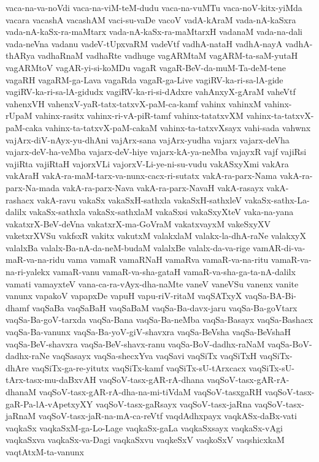 {vaca-na-va-noVdi
vaca-na-viM-teM-dudu
vaca-na-vuMTu
vaca-noV-kitx-yiMda
vacara
vacashA
vacashAM
vaci-su-vaDe
vacoV
vadA-kAraM
vada-nA-kaSxra
vada-nA-kaSx-ra-maMtarx
vada-nA-kaSx-ra-maMtarxH
vadanaM
vada-na-dali
vada-neVna
vadanu
vadeV-tUpxvaRM
vadeVtf
vadhA-nataH
vadhA-nayA
vadhA-thARya
vadhaRnaM
vadhaRte
vadhuge
vagARMtaM
vagARM-ta-saM-yutaH
vagARMtoV
vagAR-yi-si-koMDu
vagaR
vagaR-BeV-da-muM-Ta-deM-tene
vagaRH
vagaRM-ga-Lava
vagaRda
vagaR-ga-Live
vagiRV-ka-ri-sa-lA-gide
vagiRV-ka-ri-sa-lA-gidudx
vagiRV-ka-ri-si-dAdxre
vahAnxyX-gAraM
vaheVtf
vahenxVH
vahenxV-yaR-tatx-tatxvX-paM-ca-kamf
vahinx
vahinxM
vahinx-rUpaM
vahinx-rasitx
vahinx-ri-vA-piR-tamf
vahinx-tatatxvXM
vahinx-ta-tatxvX-paM-caka
vahinx-ta-tatxvX-paM-cakaM
vahinx-ta-tatxvXsayx
vahi-sada
vahwnx
vajArx-diV-nAyx-yu-dhAni
vajArx-sana
vajArx-yudha
vajarx
vajarx-deVha
vajarx-deV-ha-veMba
vajarx-deV-hiye
vajarx-kA-ya-neMba
vajayxR
vajf
vajiRsi
vajiRta
vajiRtaH
vajorxVLi
vajorxV-Li-ye-ni-su-vudu
vakASxyXmi
vakAra
vakAraH
vakA-ra-maM-tarx-va-nunx-cacx-ri-sutatx
vakA-ra-parx-Nama
vakA-ra-parx-Na-mada
vakA-ra-parx-Nava
vakA-ra-parx-NavaH
vakA-rasayx
vakA-rashacx
vakA-ravu
vakaSx
vakaSxH-sathxla
vakaSxH-sathxleV
vakaSx-sathx-La-dalilx
vakaSx-sathxla
vakaSx-sathxlaM
vakaSxsi
vakaSxyXteV
vaka-na-yana
vakatxrX-BeV-deVna
vakatxrX-ma-GoVraM
vakatxvayxM
vakeSxyXV
vaketxrXVSu
vakfsxR
vakitx
vakutxM
valakxlaM
valakx-la-dhA-raNe
valakxyX
valalxBa
valalx-Ba-nA-da-neM-budaM
valalxBe
valalx-da-va-rige
vamAR-di-va-maR-va-na-ridu
vama
vamaR
vamaRNaH
vamaRva
vamaR-va-na-ritu
vamaR-va-na-ri-yalekx
vamaR-vanu
vamaR-va-sha-gataH
vamaR-va-sha-ga-ta-nA-dalilx
vamati
vamayxteV
vana-ca-ra-vAyx-dha-naMte
vaneV
vaneVSu
vanenx
vanite
vanunx
vapakoV
vapapxDe
vapuH
vapu-riV-ritaM
vaqSATxyX
vaqSa-BA-Bi-dhamf
vaqSaBa
vaqSaBaH
vaqSaBaM
vaqSa-Ba-davx-jaru
vaqSa-Ba-goVtarx
vaqSa-Ba-goV-tarxda
vaqSa-Bana
vaqSa-Ba-neMba
vaqSa-Basayx
vaqSa-Bashacx
vaqSa-Ba-vanunx
vaqSa-Ba-yoV-giV-shavxra
vaqSa-BeVsha
vaqSa-BeVshaH
vaqSa-BeV-shavxra
vaqSa-BeV-shavx-ranu
vaqSa-BoV-dadhx-raNaM
vaqSa-BoV-dadhx-raNe
vaqSasayx
vaqSa-shecxYva
vaqSavi
vaqSiTx
vaqSiTxH
vaqSiTx-dhAre
vaqSiTx-ga-re-yitutx
vaqSiTx-kamf
vaqSiTx-sU-tArxcacx
vaqSiTx-sU-tArx-tasx-mu-daBxvAH
vaqSoV-tasx-gAR-rA-dhana
vaqSoV-tasx-gAR-rA-dhanaM
vaqSoV-tasx-gAR-rA-dha-na-mi-tiVdaM
vaqSoV-tasxgaRH
vaqSoV-tasx-gaR-Pa-lA-vApetxyXY
vaqSoV-tasx-gaRsayx
vaqSoV-tasx-jaRna
vaqSoV-tasx-jaRnaM
vaqSoV-tasx-jaR-na-mA-ca-reVtf
vaqdAdhxpayx
vaqkASx-daBx-vati
vaqkaSx
vaqkaSxM-ga-Lo-Lage
vaqkaSx-gaLa
vaqkaSxsayx
vaqkaSx-vAgi
vaqkaSxva
vaqkaSx-va-Dagi
vaqkaSxvu
vaqkeSxV
vaqkoSxV
vaqshicxkaM
vaqtAtxM-ta-vanunx
}
